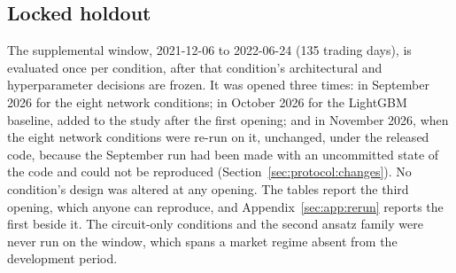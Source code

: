 \subsection{Locked holdout}
\label{sec:protocol:holdout}
The supplemental window, 2021-12-06 to 2022-06-24 (\num{135} trading days), is
evaluated once per condition, after that condition's architectural and
hyperparameter decisions are frozen. It was opened three times: in September
2026 for the eight network conditions; in October 2026 for the LightGBM
baseline, added to the study after the first opening; and in November 2026,
when the eight network conditions were re-run on it, unchanged, under the
released code, because the September run had been made with an uncommitted
state of the code and could not be reproduced
(Section~\ref{sec:protocol:changes}). No condition's design was altered at any
opening. The tables report the third opening, which anyone can reproduce, and
Appendix~\ref{sec:app:rerun} reports the first beside it. The circuit-only
conditions and the second ansatz family were never run on the window, which
spans a market regime absent from the development period.

